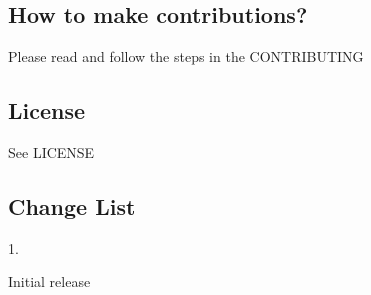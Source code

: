 \subsection*{How to make contributions?}

Please read and follow the steps in the C\+O\+N\+T\+R\+I\+B\+U\+T\+I\+NG

\subsection*{License}

See L\+I\+C\+E\+N\+SE

\subsection*{Change List}

1.
\begin{DoxyItemize}
\item Initial release 
\end{DoxyItemize}